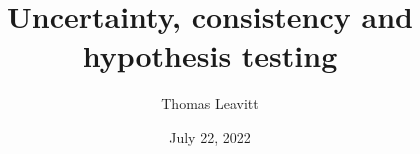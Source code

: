 \documentclass[table, xcolor = {dvipsnames}, 9pt]{beamer}
\title[]{Uncertainty, consistency and hypothesis testing} %
\author{Thomas Leavitt} %
\institute[] %
{
\medskip
\textit{} %
}
\date{July 22, 2022} %
\theoremstyle{plain}
\begin{document}
\begin{frame}
\titlepage %
\end{frame}


\end{document}
